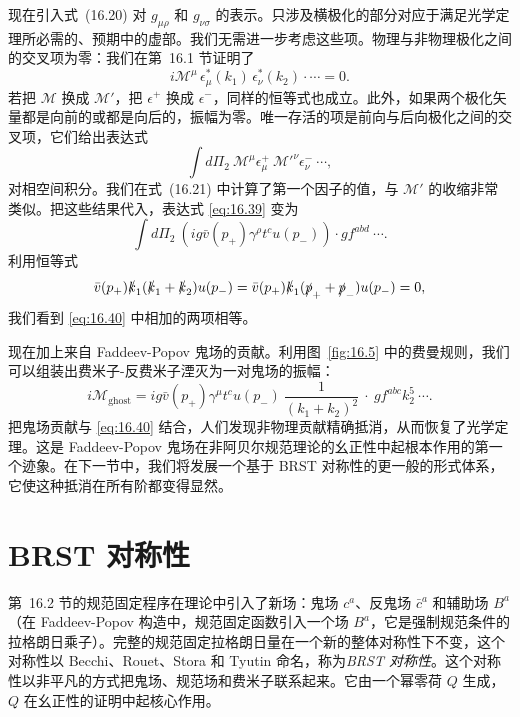 现在引入式~(16.20) 对 $g_{\mu\rho}$ 和 $g_{\nu\sigma}$ 的表示。只涉及横极化的部分对应于满足光学定理所必需的、预期中的虚部。我们无需进一步考虑这些项。物理与非物理极化之间的交叉项为零：我们在第~16.1 节证明了
\begin{equation}
  i\mathcal{M}^\mu\,\epsilon^{*}_{\mu}(k_1)\,\epsilon^{*}_{\nu}(k_2)
    \cdot\cdots = 0 .
  \label{eq:16.38}
\end{equation}
若把 $\mathcal{M}$ 换成 $\mathcal{M}'$，把 $\epsilon^{+}$ 换成 $\epsilon^{-}$，同样的恒等式也成立。此外，如果两个极化矢量都是向前的或都是向后的，振幅为零。唯一存活的项是前向与后向极化之间的交叉项，它们给出表达式
\begin{equation}
  \int d\Pi_2\ \mathcal{M}^\mu\epsilon^{+}_{\mu}\ \mathcal{M}'^\nu
    \epsilon^{-}_{\nu}\ \cdots ,
  \label{eq:16.39}
\end{equation}
对相空间积分。我们在式~(16.21) 中计算了第一个因子的值，与 $\mathcal{M}'$ 的收缩非常类似。把这些结果代入，表达式 \eqref{eq:16.39} 变为
\begin{equation}
  \int d\Pi_2\ (ig\bar{v}(p_+)\gamma^\rho t^c u(p_-))\cdot g f^{abd}\ \cdots .
  \label{eq:16.40}
\end{equation}
利用恒等式
\begin{equation}
  \bar{v}(p_+)\slashed{k}_1(\slashed{k}_1+\slashed{k}_2)u(p_-)
  = \bar{v}(p_+)\slashed{k}_1(\slashed{p}_+ + \slashed{p}_-)u(p_-) = 0 ,
  \label{eq:16.41}
\end{equation}
我们看到 \eqref{eq:16.40} 中相加的两项相等。

现在加上来自 Faddeev-Popov 鬼场的贡献。利用图~\ref{fig:16.5} 中的费曼规则，我们可以组装出费米子-反费米子湮灭为一对鬼场的振幅：
\begin{equation}
  i\mathcal{M}_{\mathrm{ghost}} = ig\bar{v}(p_+)\gamma^\mu t^c u(p_-)\
    \frac{1}{(k_1+k_2)^2}\ \cdot\ gf^{abc}k^5_2\ \cdots .
  \label{eq:16.42}
\end{equation}
把鬼场贡献与 \eqref{eq:16.40} 结合，人们发现非物理贡献精确抵消，从而恢复了光学定理。这是 Faddeev-Popov 鬼场在非阿贝尔规范理论的幺正性中起根本作用的第一个迹象。在下一节中，我们将发展一个基于 BRST 对称性的更一般的形式体系，它使这种抵消在所有阶都变得显然。

\section{BRST 对称性}

第~16.2 节的规范固定程序在理论中引入了新场：鬼场 $c^a$、反鬼场 $\bar{c}^a$ 和辅助场 $B^a$（在 Faddeev-Popov 构造中，规范固定函数引入一个场 $B^a$，它是强制规范条件的拉格朗日乘子）。完整的规范固定拉格朗日量在一个新的整体对称性下不变，这个对称性以 Becchi、Rouet、Stora 和 Tyutin 命名，称为\emph{BRST 对称性}。这个对称性以非平凡的方式把鬼场、规范场和费米子联系起来。它由一个幂零荷 $Q$ 生成，$Q$ 在幺正性的证明中起核心作用。

